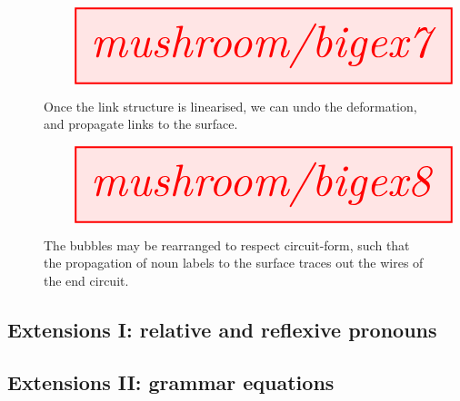 \begin{figure}[h!]
\centering
\[
\resizebox{\textwidth}{!}{\tikzfig{mushroom/bigex7}}
\]
\caption{Once the link structure is linearised, we can undo the deformation, and propagate links to the surface.}
\end{figure}

\begin{figure}[h!]
\centering
\[
\resizebox{\textwidth}{!}{\tikzfig{mushroom/bigex8}}
\]
\caption{The bubbles may be rearranged to respect circuit-form, such that the propagation of noun labels to the surface traces out the wires of the end circuit.}
\end{figure}

\clearpage
\newpage
\subsection{Extensions I: relative and reflexive pronouns}


\begin{example}

\end{example}


\begin{example}

\end{example}


\begin{example}

\end{example}

\subsection{Extensions II: grammar equations}


\begin{example}

\end{example}


\begin{example}

\end{example}


